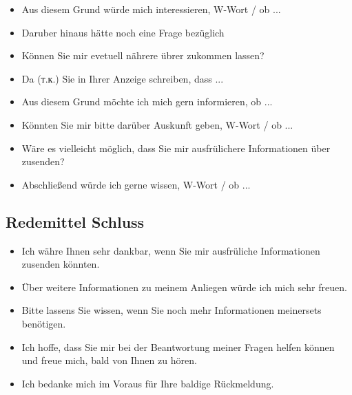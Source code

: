 \begin{itemize}
    \item Aus diesem Grund würde mich interessieren, W-Wort / ob ...
    \item Daruber hinaus hätte noch eine Frage bezüglich \gen
    \item Können Sie mir evetuell nährere übrer \akk zukommen lassen?
    \item Da (т.к.) Sie in Ihrer Anzeige schreiben, dass ...
    \item Aus diesem Grund möchte ich mich gern informieren, ob ...
    \item Könnten Sie mir bitte darüber Auskunft geben, W-Wort / ob ...
    \item Wäre es vielleicht möglich, dass Sie mir ausfrülichere Informationen über \akk zusenden?
    \item Abschließend würde ich gerne wissen, W-Wort / ob ...
\end{itemize}

\subsection{Redemittel Schluss}

\begin{itemize}
    \item Ich währe Ihnen sehr dankbar, wenn Sie mir ausfrüliche Informationen zusenden könnten.
    \item Über weitere Informationen zu meinem Anliegen würde ich mich sehr freuen.
    \item Bitte lassens Sie  wissen, wenn Sie noch mehr Informationen meinersets benötigen.
    \item Ich hoffe, dass Sie mir bei der Beantwortung meiner Fragen helfen können und freue mich, bald von Ihnen zu hören.
    \item Ich bedanke mich im Voraus für Ihre baldige Rückmeldung.
\end{itemize}
